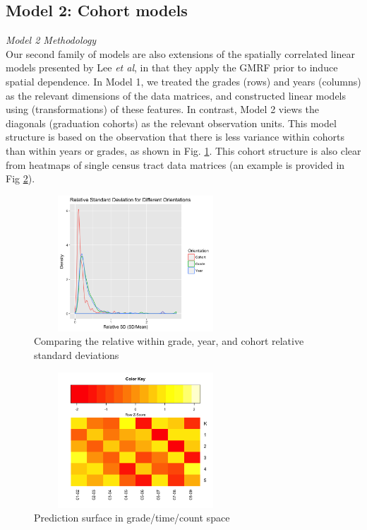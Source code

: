 \documentclass[journal]{IEEEtran}
\begin{document}
\subsection{Model 2: Cohort models}

\noindent\emph{Model 2 Methodology} \\

Our second family of models are also extensions of the spatially correlated linear models presented by Lee \emph{et al}, in that they apply the GMRF prior to induce spatial dependence. In Model 1, we treated the grades (rows) and years (columns) as the relevant dimensions of the data matrices, and constructed linear models using (transformations) of these features. In contrast, Model 2 views the diagonals (graduation cohorts) as the relevant observation units.  This model structure is based on the observation that there is less variance within cohorts than within years or grades, as shown in Fig. \ref{fig:directions_of_variance}. This cohort structure is also clear from heatmaps of single census tract data matrices (an example is provided in Fig \ref{fig:heatmap}).

\begin{figure}[h!]
    \centering
    \includegraphics[width=3in,height=2in,clip,keepaspectratio]{directions_of_variance.png}
    \caption{Comparing the relative within grade, year, and cohort relative standard deviations}
    \label{fig:directions_of_variance}
\end{figure}

\begin{figure}
    \centering
    \includegraphics[width=3in,height=2in,clip,keepaspectratio]{heat_map.png}
    \caption{Prediction surface in grade/time/count  space}
    \label{fig:heatmap}
\end{figure}
\end{document}
